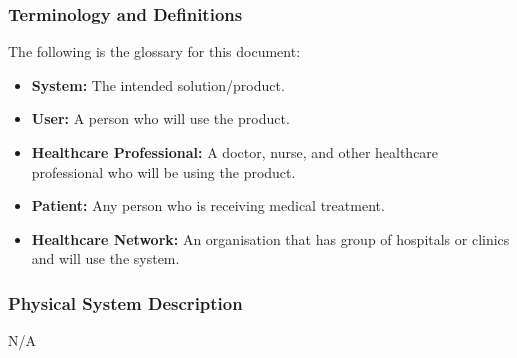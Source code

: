 \documentclass[12pt]{article}
\begin{document}
\subsubsection{Terminology and Definitions} \label{sec_TerminologyDefinitions}

The following is the glossary for this document:

\begin{itemize}
  \item \textbf{System:} The intended solution/product.
  \item \textbf{User:} A person who will use the product.
  \item \textbf{Healthcare Professional:} A doctor, nurse, and other healthcare professional who will be using the product.
  \item \textbf{Patient:} Any person who is receiving medical treatment.
  \item \textbf{Healthcare Network:} An organisation that has group of hospitals or clinics and will use the system.
\end{itemize}


\subsubsection{Physical System Description} \label{sec_phySystDescrip}
N/A
\end{document}
